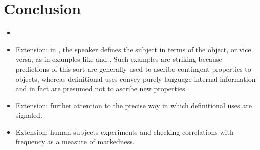 \section{Conclusion}\label{sec:conclusion}

\begin{itemize}
\item 

\item Extension: in , the
  speaker defines the subject in terms of the object, or vice versa,
  as in examples like  and
  .  Such examples are striking
  because predictions of this sort are generally used to ascribe
  contingent properties to objects, whereas definitional uses convey
  purely language-internal information and in fact are presumed not to
  ascribe new properties.

\item Extension: further attention to the precise way in which
  definitional uses are signaled.

\item Extension: human-subjects experiments and checking correlations
  with frequency as a measure of markedness.
\end{itemize}



